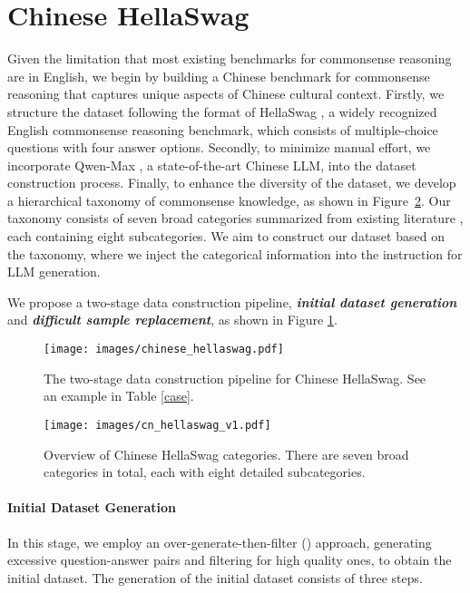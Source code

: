\section{Chinese HellaSwag} \label{sec:chinese_hellaswag}
Given the limitation that most existing benchmarks for commonsense reasoning are in English, we begin by building a Chinese benchmark for commonsense reasoning that captures unique aspects of Chinese cultural context.
Firstly, we structure the dataset following the format of HellaSwag \cite{zellers2019hellaswag}, a widely recognized English commonsense reasoning benchmark, which consists of multiple-choice questions with four answer options.
Secondly, to minimize manual effort, we incorporate Qwen-Max \cite{yang2024qwen2}, a state-of-the-art Chinese LLM, into the dataset construction process.
Finally, to enhance the diversity of the dataset, we develop a hierarchical taxonomy of commonsense knowledge, as shown in Figure~\ref{cn_hellaswag}. Our taxonomy consists of seven broad categories summarized from existing literature \cite{zellers2019hellaswag, koupaee2018wikihow, caba2015activitynet}, each containing eight subcategories. We aim to construct our dataset based on the taxonomy, where we inject the categorical information into the instruction for LLM generation. 

We propose a two-stage data construction pipeline, \textbf{\textit{initial dataset generation}} and \textbf{\textit{difficult sample replacement}}, as shown in Figure \ref{overview}. 

\begin{figure}[t] 
\centering
\setlength{\abovecaptionskip}{0.05cm}
\setlength{\belowcaptionskip}{0cm}
\texttt{[image: images/chinese\_hellaswag.pdf]}
\caption{The two-stage data construction pipeline for Chinese HellaSwag. See an example in Table \ref{case}.}
\label{overview}
\end{figure}

\begin{figure}[t]   
\centering
\setlength{\abovecaptionskip}{0.1cm}
\setlength{\belowcaptionskip}{0cm}
\texttt{[image: images/cn\_hellaswag\_v1.pdf]}
\caption{Overview of Chinese HellaSwag categories. There are seven broad categories in total, each with eight detailed subcategories.}
\label{cn_hellaswag}
\vspace{-8pt}
\end{figure}


\paragraph{Initial Dataset Generation} 
In this stage, we employ an over-generate-then-filter (\citealp{yuan2023distilling}) approach, \ie generating excessive question-answer pairs and filtering for high quality ones, to obtain the initial dataset. The generation of the initial dataset consists of three steps. 

